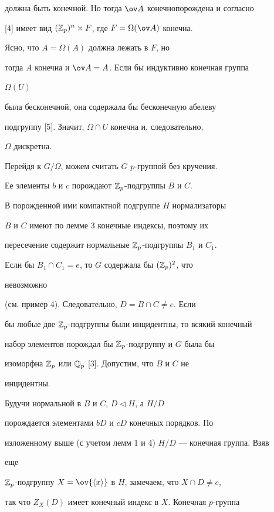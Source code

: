должна быть конечной. Но тогда $\ov A$ конечнопорождена и согласно 


[4] имеет вид $(\Bbb Z_p)^n\times F$, где $F=\Omega(\ov 


A)$ конечна. 


Ясно, что $A=\Omega(A)$ должна лежать в $F$, но  


тогда $A$ конечна и $\ov A=A$. Если бы индуктивно конечная группа 


$\Omega(U)$ 


была бесконечной, она содержала бы бесконечную абелеву 


подгруппу [5]. Значит, $\Omega\cap U$ конечна и, следовательно, 


$\Omega$ дискретна. 


 


Перейдя к $G/\Omega$, можем считать $G$\; $p$-группой без кручения. 


Ее элементы $b$ и $c$ порождают $\Bbb Z_p$-подгруппы $B$ и $C$. 


В порожденной ими компактной подгруппе $H$ нормализаторы 


$B$ и $C$ имеют по лемме 3 конечные индексы, поэтому их  


пересечение содержит нормальные $\Bbb Z_p$-подгруппы $B_1$ и $C_1$. 


Если бы $B_1\cap C_1=e$, то $G$ содержала бы $(\Bbb Z_p)^2$, что 


невозможно 


(см. пример 4). Следовательно, $D=B\cap C\ne e$. Если  


бы любые две $\Bbb Z_p$-подгруппы были инцидентны, то всякий конечный 


набор элементов порождал бы $\Bbb Z_p$-подгруппу и $G$ была бы 


изоморфна $\Bbb Z_p$ или $\Bbb Q_p$ [3]. Допустим, что $B$ и $C$ не 


инцидентны. 


Будучи нормальной в $B$ и $C$, $D\triangleleft H$, а $H/D$ 


порождается элементами $bD$ и $cD$ конечных порядков. По 


изложенному выше (с учетом лемм 1 и 4) $H/D$ --- конечная группа. Взяв 


еще 


$\Bbb Z_p$-подгруппу $X=\ov{\la x\ra}$ в $H$, замечаем, что $X\cap 


D\ne e$, 


так что $Z_X(D)$ имеет конечный индекс в $X$. Конечная $p$-группа  


